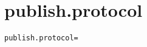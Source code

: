 \section{publish.protocol}
\label{configuration:PublishProtocol}
\ClearAPI
\TODO
\begin{lstlisting}[style=Props,caption={Usage example for \textit{publish.protocol}}]
publish.protocol=
\end{lstlisting}